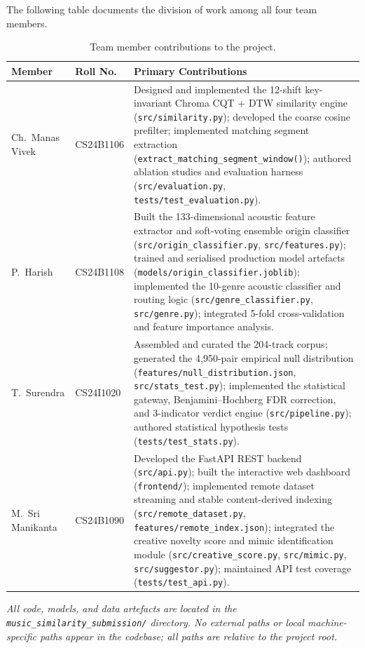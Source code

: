 \documentclass[12pt,a4paper]{article}
\begin{document}
The following table documents the division of work among all four team members.

\renewcommand{\arraystretch}{1.4}
\begin{table}[H]
\centering
\caption{Team member contributions to the project.}
\label{tab:contributions}
\begin{tabularx}{\textwidth}{|l|l|X|}
\hline
\textbf{Member} & \textbf{Roll No.} & \textbf{Primary Contributions} \\
\hline
Ch.\ Manas Vivek & CS24B1106 &
  Designed and implemented the 12-shift key-invariant Chroma CQT + DTW
  similarity engine (\texttt{src/similarity.py}); developed the coarse cosine
  prefilter; implemented matching segment extraction
  (\texttt{extract\_matching\_segment\_window()}); authored ablation studies and
  evaluation harness (\texttt{src/evaluation.py},
  \texttt{tests/test\_evaluation.py}). \\
\hline
P.\ Harish & CS24B1108 &
  Built the 133-dimensional acoustic feature extractor and soft-voting ensemble
  origin classifier (\texttt{src/origin\_classifier.py},
  \texttt{src/features.py}); trained and serialised production model artefacts
  (\texttt{models/origin\_classifier.joblib}); implemented the 10-genre acoustic
  classifier and routing logic (\texttt{src/genre\_classifier.py},
  \texttt{src/genre.py}); integrated 5-fold cross-validation and feature
  importance analysis. \\
\hline
T.\ Surendra & CS24I1020 &
  Assembled and curated the 204-track corpus; generated the 4,950-pair empirical
  null distribution (\texttt{features/null\_distribution.json},
  \texttt{src/stats\_test.py}); implemented the statistical gateway,
  Benjamini--Hochberg FDR correction, and 3-indicator verdict engine
  (\texttt{src/pipeline.py}); authored statistical hypothesis tests
  (\texttt{tests/test\_stats.py}). \\
\hline
M.\ Sri Manikanta & CS24B1090 &
  Developed the FastAPI REST backend (\texttt{src/api.py}); built the
  interactive web dashboard (\texttt{frontend/}); implemented remote dataset
  streaming and stable content-derived indexing
  (\texttt{src/remote\_dataset.py}, \texttt{features/remote\_index.json});
  integrated the creative novelty score and mimic identification module
  (\texttt{src/creative\_score.py}, \texttt{src/mimic.py},
  \texttt{src/suggestor.py}); maintained API test coverage
  (\texttt{tests/test\_api.py}). \\
\hline
\end{tabularx}
\end{table}

\vspace{1em}
\noindent\textit{All code, models, and data artefacts are located in the
\texttt{music\_similarity\_submission/} directory. No external paths or
local machine-specific paths appear in the codebase; all paths are
relative to the project root.}
\end{document}
